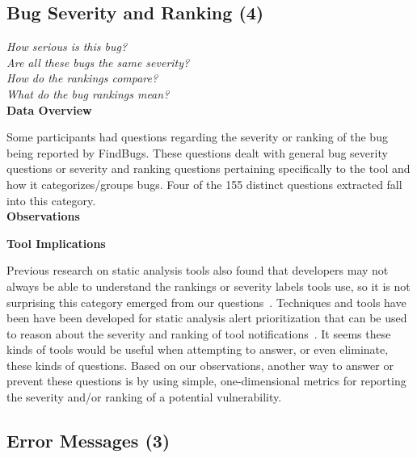 \documentclass[conference]{IEEEtran}
\begin{document}

\noindent\subsection{\textbf{Bug Severity and Ranking (4)}}\label{bsr}

\noindent\emph{How serious is this bug?} \\
\emph{Are all these bugs the same severity?} \\
\emph{How do the rankings compare?} \\
\emph{What do the bug rankings mean?} \\


\noindent\textbf{Data Overview}

Some participants had questions regarding the severity or ranking of the bug being reported by FindBugs. 
These questions dealt with general bug severity questions or severity and ranking questions pertaining specifically to the tool and how it categorizes/groups bugs. 
Four of the 155 distinct questions extracted fall into this category. 
\\

\noindent\textbf{Observations}


\noindent\textbf{Tool Implications}

Previous research on static analysis tools also found that developers may not always be able to understand the rankings or severity labels tools use, so it is not surprising this category emerged from our questions~\cite{johnson2013don}.
Techniques and tools have been have been developed for static analysis alert prioritization that can be used to reason about the severity and ranking of tool notifications~\cite{kim2007prioritizing, boogerd2006prioritizing, kremenek2004correlation}.
It seems these kinds of tools would be useful when attempting to answer, or even eliminate, these kinds of questions. 
Based on our observations, another way to answer or prevent these questions is by using simple, one-dimensional metrics for reporting the severity and/or ranking of a potential vulnerability.



\noindent\subsection{\textbf{Error Messages (3)}}\label{em}
\end{document}
